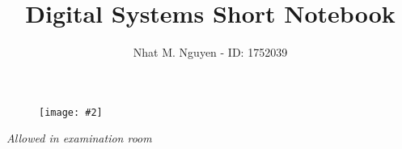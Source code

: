\documentclass[9pt, landscape, a4paper]{scrartcl}
\title{\vspace{-4ex}\Large{Digital Systems Short Notebook}}
\author{Nhat M. Nguyen - ID: 1752039}
\newcommand{\ti}[1]{\textit{#1}}
\newcommand{\img}[2][]
  {
    \begin{figure}[H]
      \centering
      \texttt{[image: \#2]}
    \end{figure}
  }
\begin{document}
  \maketitle
  \img[width=3cm]{logo.jpeg}
  \setcounter{tocdepth}{2}
  \begin{multicols}{2}
    \tableofcontents
  \end{multicols}
  \begin{center}
  \ti{Allowed in examination room}
  \end{center}
  \clearpage
  
  
  
  
  
  
  
  
  
\end{document}
